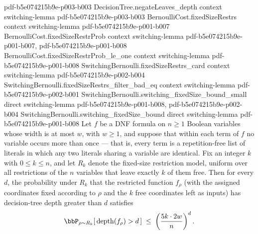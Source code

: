\begin{lemma}
  {pdf-b5e074215b9e-p003-b003}
\proofstep
  {DecisionTree.negateLeaves_depth}
  {context}
  {switching-lemma}
  {pdf-b5e074215b9e-p003-b003}
\proofstep
  {BernoulliCost.fixedSizeRestrs}
  {context}
  {switching-lemma}
  {pdf-b5e074215b9e-p001-b007}
\proofstep
  {BernoulliCost.fixedSizeRestrProb}
  {context}
  {switching-lemma}
  {pdf-b5e074215b9e-p001-b007,
    pdf-b5e074215b9e-p001-b008}
\proofstep
  {BernoulliCost.fixedSizeRestrProb_le_one}
  {context}
  {switching-lemma}
  {pdf-b5e074215b9e-p001-b008}
\proofstep
  {SwitchingBernoulli.fixedSizeRestrs_card}
  {context}
  {switching-lemma}
  {pdf-b5e074215b9e-p002-b004}
\proofstep
  {SwitchingBernoulli.fixedSizeRestrs_filter_bad_eq}
  {context}
  {switching-lemma}
  {pdf-b5e074215b9e-p002-b001}
\proofstep
  {SwitchingBernoulli.switching_fixedSize_bound_small}
  {direct}
  {switching-lemma}
  {pdf-b5e074215b9e-p001-b008,
    pdf-b5e074215b9e-p002-b004}
\proofstep
  {SwitchingBernoulli.switching_fixedSize_bound}
  {direct}
  {switching-lemma}
  {pdf-b5e074215b9e-p001-b008}
Let $f$ be a DNF formula on $n \ge 1$ Boolean variables whose width is at most $w$, with
$w \ge 1$, and suppose that within each term of $f$ no variable occurs more than once —
that is, every term is a repetition-free list of literals in which any two literals
sharing a variable are identical. Fix an integer $k$ with $0 \le k \le n$, and let $R_k$
denote the fixed-size restriction model, uniform over all restrictions of the $n$
variables that leave exactly $k$ of them free. Then for every $d$, the probability under
$R_k$ that the restricted function $f_\rho$ (with the assigned coordinates fixed
according to $\rho$ and the $k$ free coordinates left as inputs) has decision-tree depth
greater than $d$ satisfies
\[ \bbP_{\rho \sim R_k}\!\left[\, \mathrm{depth}(f_\rho) > d \,\right] \;\le\; \left(\frac{5k \cdot 2w}{n}\right)^{d}. \]
\end{lemma}

